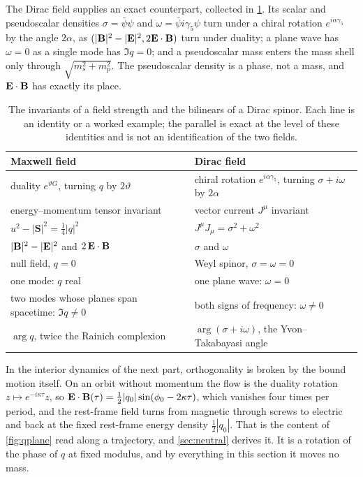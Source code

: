 The Dirac field supplies an exact counterpart, collected in \cref{tab:diracmaxwell}. Its scalar and pseudoscalar densities
$\sigma=\bar\psi\psi$ and $\omega=\bar\psi i\gamma_5\psi$ turn under a chiral rotation $e^{i\alpha\gamma_5}$ by the angle $2\alpha$, as
$(|\mathbf B|^2-|\mathbf E|^2,2\mathbf E\cdot\mathbf B)$ turn under duality; a plane wave has $\omega=0$ as a single mode has $\Im q=0$; and a pseudoscalar mass enters
the mass shell only through $\sqrt{m_s^2+m_p^2}$. The pseudoscalar density is a phase, not a mass, and $\mathbf E\cdot\mathbf B$ has exactly its place.

\begin{table}[t]
\centering
\small
\begin{tabular}{@{}ll@{}}
\toprule
Maxwell field & Dirac field\\
\midrule
duality $e^{\vartheta G}$, turning $q$ by $2\vartheta$ & chiral rotation $e^{i\alpha\gamma_5}$, turning $\sigma+i\omega$ by $2\alpha$\\
energy--momentum tensor invariant & vector current $J^\mu$ invariant\\
$u^2-|\mathbf S|^2=\tfrac14|q|^2$ & $J^\mu J_\mu=\sigma^2+\omega^2$\\
$|\mathbf B|^2-|\mathbf E|^2$ and $2\,\mathbf E\cdot\mathbf B$ & $\sigma$ and $\omega$\\
null field, $q=0$ & Weyl spinor, $\sigma=\omega=0$\\
one mode: $q$ real & one plane wave: $\omega=0$\\
two modes whose planes span spacetime: $\Im q\neq0$ & both signs of frequency: $\omega\neq0$\\
$\arg q$, twice the Rainich complexion & $\arg(\sigma+i\omega)$, the Yvon--Takabayasi angle\\
\bottomrule
\end{tabular}
\caption{The invariants of a field strength and the bilinears of a Dirac spinor. Each line is an identity or a worked example; the
parallel is exact at the level of these identities and is not an identification of the two fields.}
\label{tab:diracmaxwell}
\end{table}

In the interior dynamics of the next part, orthogonality is broken by the bound motion itself. On an orbit without momentum the flow
is the duality rotation $z\mapsto e^{-i\kappa\tau}z$, so $\mathbf E\cdot\mathbf B(\tau)=\tfrac12|q_0|\sin(\phi_0-2\kappa\tau)$, which vanishes four times per
period, and the rest-frame field turns from magnetic through screws to electric and back at the fixed rest-frame energy density
$\tfrac12|q_0|$. That is the content of \cref{fig:qplane} read along a trajectory, and \cref{sec:neutral} derives it. It is a rotation of
the phase of $q$ at fixed modulus, and by everything in this section it moves no mass.
